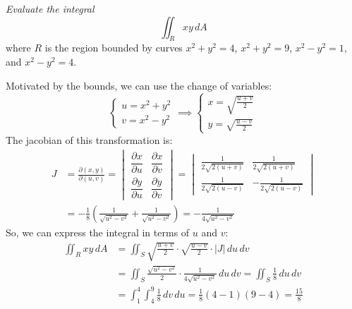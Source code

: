 \documentclass[11pt]{report}
\begin{document}
\begin{example} \label{ex:change_of_variables}
    \textit{Evaluate the integral}
    $$
        \iint_R xy \, dA
    $$
    where $R$ is the region bounded by curves $x^2 + y^2 = 4$, $x^2 + y^2 = 9$, $x^2 - y^2 = 1$, and $x^2 - y^2 = 4$.

    Motivated by the bounds, we can use the change of variables:
    $$
    \begin{cases}
        u = x^2 + y^2 \\
        v = x^2 - y^2
    \end{cases} \implies \begin{cases}
        x = \sqrt{\frac{u + v}{2}} \\
        y = \sqrt{\frac{u - v}{2}}
    \end{cases}
    $$
    The jacobian of this transformation is:
    \begin{align*}
        J &= \frac{\partial(x,y)}{\partial(u,v)} = \begin{vmatrix}
            \dfrac{\partial x}{\partial u} & \dfrac{\partial x}{\partial v} \\
            \dfrac{\partial y}{\partial u} & \dfrac{\partial y}{\partial v}
        \end{vmatrix} = \begin{vmatrix}
            \frac{1}{2\sqrt{2(u+v)}} & \frac{1}{2\sqrt{2(u+v)}} \\
            \frac{1}{2\sqrt{2(u-v)}} & -\frac{1}{2\sqrt{2(u-v)}}
        \end{vmatrix} \\
        &= -\frac{1}{8} \left( \frac{1}{\sqrt{u^2 - v^2}} + \frac{1}{\sqrt{u^2 - v^2}} \right) = -\frac{1}{4\sqrt{u^2 - v^2}}
    \end{align*}
    So, we can express the integral in terms of $u$ and $v$:
    \begin{align*}
        \iint_R xy \, dA &= \iint_S \sqrt{\frac{u + v}{2}} \cdot \sqrt{\frac{u - v}{2}} \cdot |J| \, du \, dv \\
        &= \iint_S \frac{\sqrt{u^2 - v^2}}{2} \cdot \frac{1}{4\sqrt{u^2 - v^2}} \, du \, dv = \iint_S \frac{1}{8} \, du \, dv \\
        &= \int_1^4 \int_4^9 \frac{1}{8} \, dv \, du = \frac{1}{8}(4 - 1)(9 - 4) = \frac{15}{8}
    \end{align*}
    
\end{example}
\end{document}
